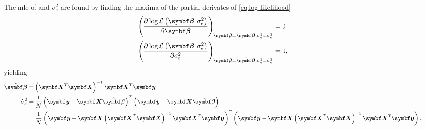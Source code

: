 %
The \gls{mle} of \tmat{\beta} and \(\sigma^2_e\) are found by finding the maxima of the partial derivates of \cref{eq:log-likelihood} 
%
\begin{align}
\left(\frac{\partial\log\mathcal{L}\left(\mat{\beta},\sigma^2_e\right)}{\partial \mat{\beta}}\right)_{\mat{\beta}=\hat{\mat{\beta}},\sigma^2_e=\hat{\sigma}^2_e} &= 0 \\
\left(\frac{\partial\log\mathcal{L}\left(\mat{\beta},\sigma^2_e\right)}{\partial \sigma^2_e}\right)_{\mat{\beta}=\hat{\mat{\beta}},\sigma^2_e=\hat{\sigma}^2_e} &= 0, 
\end{align}
%
yielding
%
\begin{align}
\hat{\mat{\beta}} & = \left(\mat{X}^T\mat{X}\right)^{-1}\mat{X}^T\mat{y} \\
\label{eq:beta-MLE}
\hat{\sigma}^2_e &= \frac{1}{N}\left(\mat{y} - \mat{X}\hat{\mat{\beta}}\right)^T\left(\mat{y} - \mat{X}\hat{\mat{\beta}}\right) \\
&= \frac{1}{N}\left(\mat{y} -\mat{X}\left(\mat{X}^T\mat{X}\right)^{-1}\mat{X}^T\mat{y}\right)^T\left(\mat{y} -\mat{X}\left(\mat{X}^T\mat{X}\right)^{-1}\mat{X}^T\mat{y}\right).
\label{eq:sigma-MLE}
\end{align}

